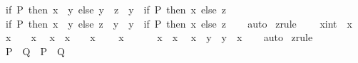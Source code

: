\begin{isabellebody}
\ \ {\isachardoublequoteopen}{\isacharparenleft}{\kern0pt}if\ P\ then\ x\ {\isacharequal}{\kern0pt}\ y\ else\ y\ {\isacharequal}{\kern0pt}\ z{\isacharparenright}{\kern0pt}\ {\isacharequal}{\kern0pt}\ {\isacharparenleft}{\kern0pt}y\ {\isacharequal}{\kern0pt}\ {\isacharparenleft}{\kern0pt}if\ P\ then\ x\ else\ z{\isacharparenright}{\kern0pt}{\isacharparenright}{\kern0pt}{\isachardoublequoteclose}\isanewline
\ \ {\isachardoublequoteopen}{\isacharparenleft}{\kern0pt}if\ P\ then\ x\ {\isacharequal}{\kern0pt}\ y\ else\ z\ {\isacharequal}{\kern0pt}\ y{\isacharparenright}{\kern0pt}\ {\isacharequal}{\kern0pt}\ {\isacharparenleft}{\kern0pt}y\ {\isacharequal}{\kern0pt}\ {\isacharparenleft}{\kern0pt}if\ P\ then\ x\ else\ z{\isacharparenright}{\kern0pt}{\isacharparenright}{\kern0pt}{\isachardoublequoteclose}\isanewline
%
\isadelimproof
\ \ %
\endisadelimproof
%
\isatagproof
{}\isamarkupfalse%
\ auto%
\endisatagproof
{\isafoldproof}%
%
\isadelimproof
\isanewline
%
\endisadelimproof
\isanewline
{}\isamarkupfalse%
\ {\isacharbrackleft}{\kern0pt}z{}{\isacharunderscore}{\kern0pt}rule{\isacharbrackright}{\kern0pt}{\isacharcolon}{\kern0pt}\isanewline
\ \ {\isachardoublequoteopen}{}\ {\isacharplus}{\kern0pt}\ {\isacharparenleft}{\kern0pt}x{\isacharcolon}{\kern0pt}{\isacharcolon}{\kern0pt}int{\isacharparenright}{\kern0pt}\ {\isacharequal}{\kern0pt}\ x{\isachardoublequoteclose}\isanewline
\ \ {\isachardoublequoteopen}x\ {\isacharplus}{\kern0pt}\ {}\ {\isacharequal}{\kern0pt}\ x{\isachardoublequoteclose}\isanewline
\ \ {\isachardoublequoteopen}x\ {\isacharplus}{\kern0pt}\ x\ {\isacharequal}{\kern0pt}\ {}\ {\isacharasterisk}{\kern0pt}\ x{\isachardoublequoteclose}\isanewline
\ \ {\isachardoublequoteopen}{}\ {\isacharasterisk}{\kern0pt}\ x\ {\isacharequal}{\kern0pt}\ {}{\isachardoublequoteclose}\isanewline
\ \ {\isachardoublequoteopen}{}\ {\isacharasterisk}{\kern0pt}\ x\ {\isacharequal}{\kern0pt}\ x{\isachardoublequoteclose}\isanewline
\ \ {\isachardoublequoteopen}x\ {\isacharplus}{\kern0pt}\ y\ {\isacharequal}{\kern0pt}\ y\ {\isacharplus}{\kern0pt}\ x{\isachardoublequoteclose}\isanewline
%
\isadelimproof
\ \ %
\endisadelimproof
%
\isatagproof
{}\isamarkupfalse%
\ auto%
\endisatagproof
{\isafoldproof}%
%
\isadelimproof
\isanewline
%
\endisadelimproof
\isanewline
{}\isamarkupfalse%
\ {\isacharbrackleft}{\kern0pt}z{}{\isacharunderscore}{\kern0pt}rule{\isacharbrackright}{\kern0pt}{\isacharcolon}{\kern0pt}\ \ \isanewline
\ \ {\isachardoublequoteopen}P\ {\isacharequal}{\kern0pt}\ Q\ {\isasymor}\ P\ {\isasymor}\ Q{\isachardoublequoteclose}\isanewline

\end{isabellebody}
